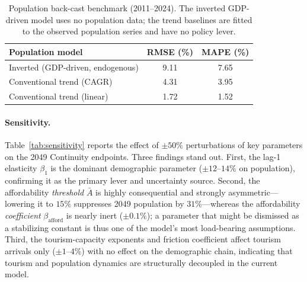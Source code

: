 \documentclass[urbansci,article,submit,pdftex,moreauthors]{Definitions/mdpi}
\begin{document}
\begin{table}[H]
\caption{Population back-cast benchmark (2011--2024). The inverted GDP-driven model
uses no population data; the trend baselines are fitted to the observed population
series and have no policy lever.}
\label{tab:benchmark}
\begin{tabularx}{\textwidth}{Xcc}
\toprule
\textbf{Population model} & \textbf{RMSE (\%)} & \textbf{MAPE (\%)} \\
\midrule
Inverted (GDP-driven, endogenous) & 9.11 & 7.65 \\
Conventional trend (CAGR)         & 4.31 & 3.95 \\
Conventional trend (linear)       & 1.72 & 1.52 \\
\bottomrule
\end{tabularx}
\end{table}

\paragraph{Sensitivity.}
Table~\ref{tab:sensitivity} reports the effect of $\pm50\%$ perturbations of key
parameters on the 2049 Continuity endpoints. Three findings stand out. First, the
lag-1 elasticity $\beta_1$ is the dominant demographic parameter ($\pm12$--$14\%$
on population), confirming it as the primary lever and uncertainty source. Second,
the affordability \emph{threshold} $\bar A$ is highly consequential and strongly
asymmetric---lowering it to $15\%$ suppresses 2049 population by $31\%$---whereas
the affordability \emph{coefficient} $\beta_\text{afford}$ is nearly inert
($\pm0.1\%$); a parameter that might be dismissed as a stabilizing constant is thus
one of the model's most load-bearing assumptions. Third, the tourism-capacity
exponents and friction coefficient affect tourism arrivals only ($\pm1$--$4\%$)
with no effect on the demographic chain, indicating that tourism and population
dynamics are structurally decoupled in the current model.
\end{document}
